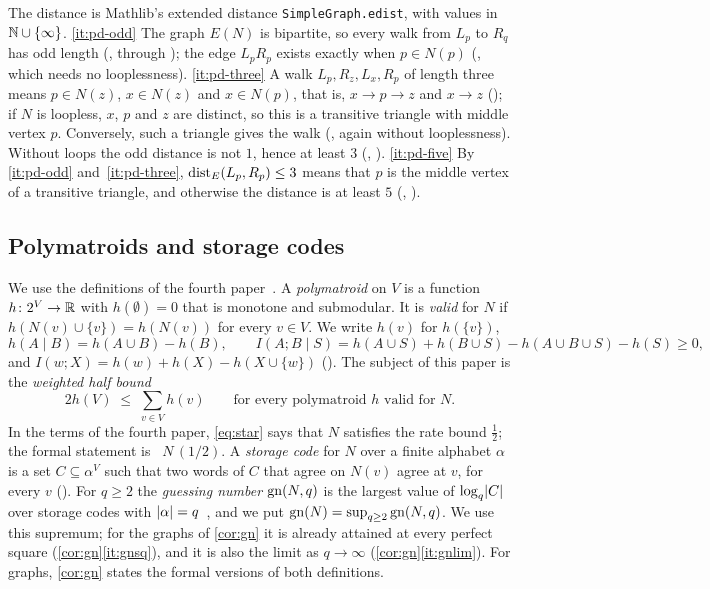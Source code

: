 \begin{outline}
The distance is Mathlib's extended distance \texttt{SimpleGraph.edist}, with values in $\mathbb{N}\cup\{\infty\}$.
\ref{it:pd-odd} The graph $E(N)$ is bipartite, so every walk from $L_p$ to $R_q$ has odd length
(, through ); the edge $L_pR_p$ exists exactly when
$p\in N(p)$ (, which needs no looplessness). \ref{it:pd-three} A walk $L_p,R_z,L_x,R_p$ of length
three means $p\in N(z)$, $x\in N(z)$ and $x\in N(p)$, that is, $x\to p\to z$ and $x\to z$ (); if
$N$ is loopless, $x$, $p$ and $z$ are distinct, so this is a transitive triangle with middle vertex $p$. Conversely,
such a triangle gives the walk (, again without looplessness). Without loops the odd
distance is not $1$, hence at least $3$ (, ). \ref{it:pd-five} By
\ref{it:pd-odd} and~\ref{it:pd-three}, $\operatorname{dist}_E(L_p,R_p)\le3$ means that $p$ is the middle vertex of a transitive triangle,
and otherwise the distance is at least $5$ (, ).
\end{outline}

\subsection{Polymatroids and storage codes}\label{sec:prelim-codes}

We use the definitions of the fourth paper~\cite[Definitions~2.1 and~2.2]{FourthPaper2026}. A \emph{polymatroid} on
$V$ is a function $h\colon2^V\to\mathbb{R}$ with $h(\emptyset)=0$ that is monotone and submodular. It is \emph{valid} for
$N$ if $h(N(v)\cup\{v\})=h(N(v))$ for every $v\in V$. We write $h(v)$ for $h(\{v\})$,
\[
  h(A\mid B)=h(A\cup B)-h(B),\qquad I(A;B\mid S)=h(A\cup S)+h(B\cup S)-h(A\cup B\cup S)-h(S)\ge0,
\]
and $I(w;X)=h(w)+h(X)-h(X\cup\{w\})$ (). The subject of this paper is the \emph{weighted half bound}
\begin{equation}\label{eq:star}
  2h(V)\;\le\;\sum_{v\in V}h(v)\qquad\text{for every polymatroid $h$ valid for $N$.}\tag{$\star$}
\end{equation}
In the terms of the fourth paper, \eqref{eq:star} says that $N$ satisfies the rate bound $\tfrac12$; the
formal statement is ~$N\,(1/2)$. A \emph{storage code} for $N$ over a finite alphabet $\alpha$ is a set
$C\subseteq\alpha^V$ such that two words of $C$ that agree on $N(v)$ agree at $v$, for every $v$
(). For $q\ge2$ the \emph{guessing number} $\mathrm{gn}(N,q)$ is the largest
value of $\log_q\lvert C \rvert$ over storage codes with $\lvert \alpha \rvert=q$~\cite{Riis2007,ChristofidesMarkstrom2011}, and we put
$\mathrm{gn}(N)=\sup_{q\ge2}\mathrm{gn}(N,q)$. We use this supremum; for the graphs of \cref{cor:gn} it is already attained at every
perfect square (\cref{cor:gn}\ref{it:gnsq}), and it is also the limit as $q\to\infty$ (\cref{cor:gn}\ref{it:gnlim}).
For graphs, \cref{cor:gn} states the formal versions of both definitions.

